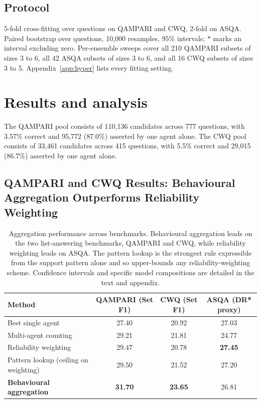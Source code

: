 \documentclass{article}
\begin{document}
\subsection{Protocol}
\label{sec:protocol}
\label{sec:crossfit}

5-fold cross-fitting over questions on QAMPARI and CWQ, 2-fold on ASQA. Paired bootstrap over questions, 10,000 resamples, $95\%$ intervals; $*$ marks an interval excluding zero. Per-ensemble sweeps cover all 210 QAMPARI subsets of sizes 3 to 6, all 42 ASQA subsets of sizes 3 to 6, and all 16 CWQ subsets of sizes 3 to 5. Appendix~\ref{app:hyper} lists every fitting setting.

\section{Results and analysis}
\label{sec:results}

The QAMPARI pool consists of 110,136 candidates across 777 questions, with 3.57\% correct and 95,772 (87.0\%) asserted by one agent alone. The CWQ pool consists of 33,461 candidates across 415 questions, with 5.5\% correct and 29,015 (86.7\%) asserted by one agent alone.

\subsection{QAMPARI and CWQ Results: Behavioural Aggregation Outperforms Reliability Weighting}
\label{sec:rq1}

\begin{table}[h]
\centering
\caption{Aggregation performance across benchmarks. Behavioural aggregation leads on the two list-answering benchmarks, QAMPARI and CWQ, while reliability weighting leads on ASQA. The pattern lookup is the strongest rule expressible from the support pattern alone and so upper-bounds any reliability-weighting scheme. Confidence intervals and specific model compositions are detailed in the text and appendix.}
\label{tab:main}
\begin{tabular}{lccc}
\toprule
\textbf{Method} & \textbf{QAMPARI (Set F1)} & \textbf{CWQ (Set F1)} & \textbf{ASQA (DR* proxy)} \\
\midrule
Best single agent & 27.40 & 20.92 & 27.03 \\
Multi-agent counting & 29.21 & 21.81 & 24.77 \\
Reliability weighting & 29.47 & 20.78 & \textbf{27.45} \\
Pattern lookup (ceiling on weighting) & 29.50 & 21.52 & 27.20 \\
\textbf{Behavioural aggregation} & \textbf{31.70} & \textbf{23.65} & 26.81 \\
\bottomrule
\end{tabular}
\end{table}
\end{document}
